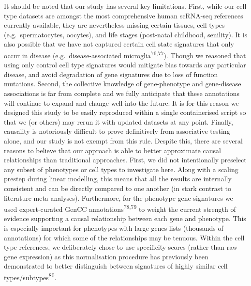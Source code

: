 \documentclass[
]{agujournal2019}
\begin{document}
It should be noted that our study has several key limitations. First,
while our cell type datasets are amongst the most comprehensive human
scRNA-seq references currently available, they are nevertheless missing
certain tissues, cell types (e.g.~spermatocytes, oocytes), and life
stages (post-natal childhood, senility). It is also possible that we
have not captured certain cell state signatures that only occur in
disease (e.g.~disease-associated microglia\textsuperscript{76,77}).
Though we reasoned that using only control cell type signatures would
mitigate bias towards any particular disease, and avoid degradation of
gene signatures due to loss of function mutations. Second, the
collective knowledge of gene-phenotype and gene-disease associations is
far from complete and we fully anticipate that these annotations will
continue to expand and change well into the future. It is for this
reason we designed this study to be easily reproduced within a single
containerised script so that we (or others) may rerun it with updated
datasets at any point. Finally, causality is notoriously difficult to
prove definitively from associative testing alone, and our study is not
exempt from this rule. Despite this, there are several reasons to
believe that our approach is able to better approximate causal
relationships than traditional approaches. First, we did not
intentionally preselect any subset of phenotypes or cell types to
investigate here. Along with a scaling prestep during linear modelling,
this means that all the results are internally consistent and can be
directly compared to one another (in stark contrast to literature
meta-analyses). Furthermore, for the phenotype gene signatures we used
expert-curated GenCC annotations\textsuperscript{78,79} to weight the
current strength of evidence supporting a causal relationship between
each gene and phenotype. This is especially important for phenotypes
with large genes lists (thousands of annotations) for which some of the
relationships may be tenuous. Within the cell type references, we
deliberately chose to use specificity scores (rather than raw gene
expression) as this normalisation procedure has previously been
demonstrated to better distinguish between signatures of highly similar
cell types/subtypes\textsuperscript{80}.
\end{document}
